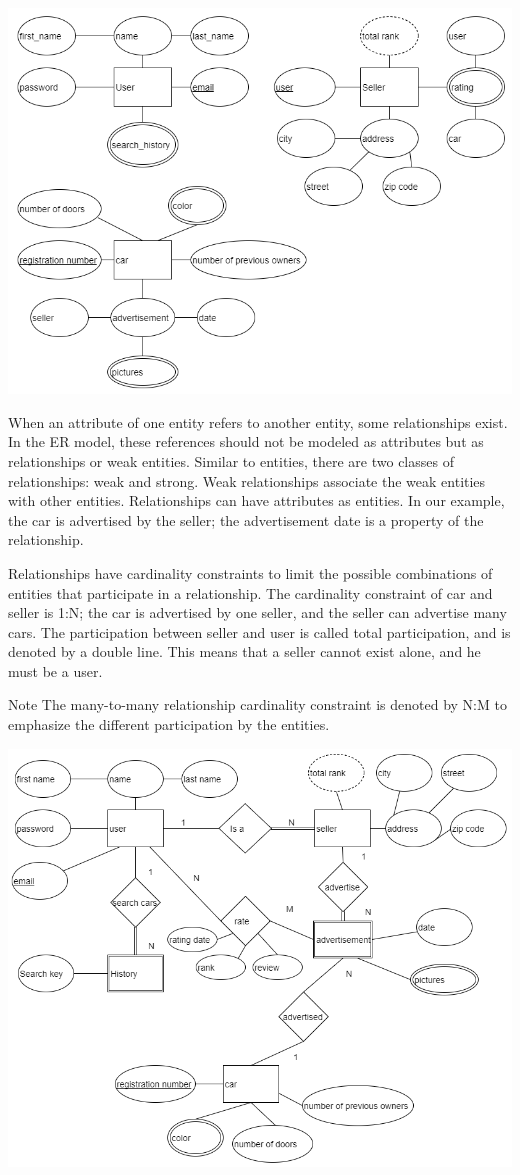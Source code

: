 \documentclass[]{book}
\begin{document}
\begin{center}\includegraphics[width=0.7\linewidth]{img/01/db_model2} \end{center}

When an attribute of one entity refers to another entity, some relationships exist. In the ER model, these references should not be modeled as attributes but as relationships or weak entities. Similar to entities, there are two classes of relationships: weak and strong. Weak relationships associate the weak entities with other entities. Relationships can have attributes as entities. In our example, the car is advertised by the seller; the advertisement date is a property of the relationship.

Relationships have cardinality constraints to limit the possible combinations of entities that participate in a relationship. The cardinality constraint of car and seller is 1:N; the car is advertised by one seller, and the seller can advertise many cars. The participation between seller and user is called total participation, and is denoted by a double line. This means that a seller cannot exist alone, and he must be a user.

Note
The many-to-many relationship cardinality constraint is denoted by N:M to emphasize the different participation by the entities.

\begin{center}\includegraphics[width=0.7\linewidth]{img/01/db_model3} \end{center}
\end{document}
